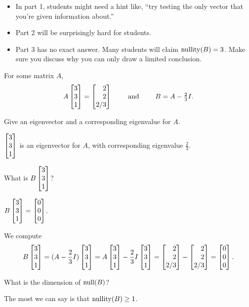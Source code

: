 \documentclass{workbook}
\begin{document}
\begin{slide}
\begin{annotation}
		\begin{notes}
			\begin{itemize}
				\item In part 1, students might need a hint like, ``try testing the only vector
					that you're given information about.''
				\item Part 2 will be surprisingly hard for students.
				\item Part 3 has no exact answer. Many students will claim $\operatorname{nullity}(B)=3$.
					Make sure you discuss why you can only draw a limited conclusion.
			\end{itemize}
		\end{notes}
	\end{annotation}
	For some matrix $A$,
	\vspace{-.2cm}
	\[
		A\mat{3\\3\\1}=\mat{2\\2\\2/3}\qquad\text{ and }\qquad B=A-\tfrac{2}{3}I.
	\]
	\vspace{-.4cm}
	\begin{parts}
		\item Give an eigenvector and a corresponding eigenvalue for $A$.
			\begin{solution}
				$\mat{3\\3\\1}$ is an eigenvector for $A$, with corresponding
				eigenvalue $\frac{2}{3}$.
			\end{solution}
		\item What is $B\mat{3\\3\\1}$?
			\begin{solution}
				$B\mat{3\\3\\1}=\mat{0\\0\\0}$.

				We compute
				\[
					B\mat{3\\3\\1}
					=(A-\frac{2}{3}I)\mat{3\\3\\1}
					=A\mat{3\\3\\1} - \frac{2}{3}I\mat{3\\3\\1}
					=\mat{2\\2\\2/3} - \mat{2\\2\\2/3}
					=\mat{0\\0\\0}.
				\]
			\end{solution}
		\item What is the dimension of $\operatorname{null}(B)$?
			\begin{solution}
				The most we can say is that $\operatorname{nullity}(B)\geq1$.


\end{solution}
\end{parts}
\end{slide}
\end{document}
